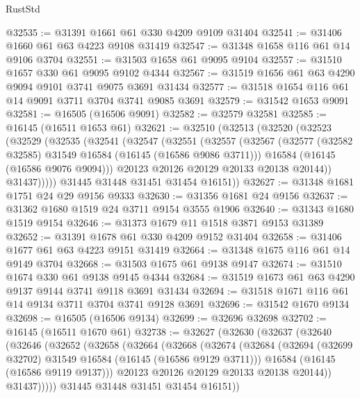 \begin{lexlean}{RustStd}
\begin{coremodule}
@32535 := @31391 @1661 @61 @330 @4209 @9109 @31404
@32541 := @31406 @1660 @61 @63 @4223 @9108 @31419
@32547 := @31348 @1658 @116 @61 @14 @9106 @3704
@32551 := @31503 @1658 @61 @9095 @9104
@32557 := @31510 @1657 @330 @61 @9095 @9102 @4344
@32567 := @31519 @1656 @61 @63 @4290 @9094 @9101 @3741 @9075 @3691 @31434
@32577 := @31518 @1654 @116 @61 @14 @9091 @3711 @3704 @3741 @9085 @3691
@32579 := @31542 @1653 @9091
@32581 := @16505 (@16506 @9091)
@32582 := @32579 @32581
@32585 := @16145 (@16511 @1653 @61)
@32621 := @32510
    (@32513
      (@32520
        (@32523
          (@32529
            (@32535
              (@32541
                (@32547
                  (@32551
                    (@32557
                      (@32567
                        (@32577 (@32582 @32585) @31549 @16584 (@16145 (@16586 @9086 @3711)))
                        @16584
                        (@16145 (@16586 @9076 @9094)))
                      @20123
                      @20126
                      @20129
                      @20133
                      @20138
                      @20144))
                  @31437)))))
        @31445
        @31448
        @31451
        @31454
        @16151))
@32627 := @31348 @1681 @1751 @24 @29 @9156 @9333
@32630 := @31356 @1681 @24 @9156
@32637 := @31362 @1680 @1519 @24 @3711 @9154 @3555 @1906
@32640 := @31343 @1680 @1519 @9154
@32646 := @31373 @1679 @11 @1518 @3871 @9153 @31389
@32652 := @31391 @1678 @61 @330 @4209 @9152 @31404
@32658 := @31406 @1677 @61 @63 @4223 @9151 @31419
@32664 := @31348 @1675 @116 @61 @14 @9149 @3704
@32668 := @31503 @1675 @61 @9138 @9147
@32674 := @31510 @1674 @330 @61 @9138 @9145 @4344
@32684 := @31519 @1673 @61 @63 @4290 @9137 @9144 @3741 @9118 @3691 @31434
@32694 := @31518 @1671 @116 @61 @14 @9134 @3711 @3704 @3741 @9128 @3691
@32696 := @31542 @1670 @9134
@32698 := @16505 (@16506 @9134)
@32699 := @32696 @32698
@32702 := @16145 (@16511 @1670 @61)
@32738 := @32627
    (@32630
      (@32637
        (@32640
          (@32646
            (@32652
              (@32658
                (@32664
                  (@32668
                    (@32674
                      (@32684
                        (@32694 (@32699 @32702) @31549 @16584 (@16145 (@16586 @9129 @3711)))
                        @16584
                        (@16145 (@16586 @9119 @9137)))
                      @20123
                      @20126
                      @20129
                      @20133
                      @20138
                      @20144))
                  @31437)))))
        @31445
        @31448
        @31451
        @31454
        @16151))

\end{coremodule}
\end{lexlean}
